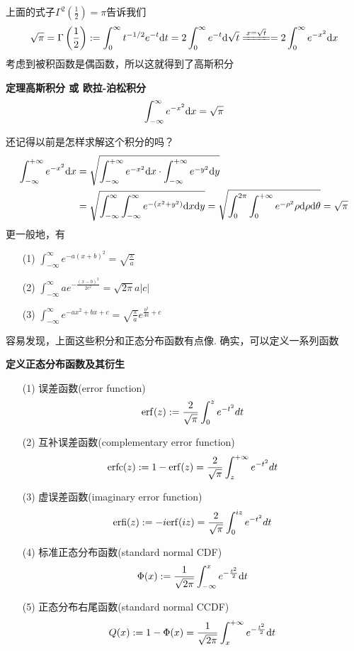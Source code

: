 \documentclass[UTF8]{ctexart}
\newcommand{\trm}[1]{{\rm #1}}
\newenvironment{definition}[1]
    {\begin{tcolorbox}[enhanced, colback=LightYellow, breakable=false, frame hidden, borderline west={1.5mm}{-2mm}{DarkGreen}]
    {\bfseries {\color{DarkGreen} 定义}\quad #1} \newline}
    {\end{tcolorbox}}
\newenvironment{theorem}[1]
    {\begin{tcolorbox}[enhanced, colback=LightYellow, breakable=true, frame hidden, borderline west={1.5mm}{-2mm}{DarkBlue}]
    {\bfseries {\color{DarkBlue} 定理}\quad #1} \newline}
    {\end{tcolorbox}}
\begin{document}
上面的式子\(\displaystyle{\Gamma^2\left(\frac{1}{2}\right) = \pi}\)告诉我们
\[\sqrt{\pi} = \Gamma\left(\frac{1}{2}\right) := \int_{0}^{\infty}t^{-1/2}e^{-t}\trm{d}t = 2\int_{0}^{\infty}e^{-t}\trm{d}\sqrt{t} \xlongequal[]{x=\sqrt{t}} = 2\int_{0}^{\infty}e^{-x^2}\trm{d}x\]
考虑到被积函数是偶函数，所以这就得到了高斯积分
\begin{theorem}{高斯积分 或 欧拉-泊松积分}
    \[\int_{-\infty}^{\infty}e^{-x^2}\trm{d}x = \sqrt{\pi}\]
\end{theorem}
还记得以前是怎样求解这个积分的吗？
\begin{align*}
    \int_{-\infty}^{+\infty} e^{-x^2} \trm{d} x &= \sqrt{\int_{-\infty}^{+\infty} e^{-x^2} \trm{d}x \cdot \int_{-\infty}^{+\infty} e^{-y^2} \trm{d}y} \\
    &= \sqrt{\int_{-\infty}^{\infty}\int_{-\infty}^{\infty} e^{-(x^2+y^2)} \trm{d}x \trm{d} y} = \sqrt{\int_{0}^{2 \pi}\int_{0}^{+\infty} e^{-\rho^2} \rho\trm{d} \rho \trm{d} \theta} = \sqrt{\pi}
\end{align*}
更一般地，有
\begin{itemize}
    \item [(1)] \(\displaystyle{\int_{-\infty}^{\infty}e^{-a(x+b)^2} = \sqrt{\frac{\pi}{a}}}\)
    \item [(2)] \(\displaystyle{\int_{-\infty}^{\infty}ae^{-\frac{(x-b)^2}{2c^2}} = \sqrt{2\pi}a|c|}\)
    \item [(3)] \(\displaystyle{\int_{-\infty}^{\infty}e^{-ax^2+bx+c} = \sqrt{\frac{\pi}{a}}}e^{\frac{b^2}{4a}+c}\)
\end{itemize}

容易发现，上面这些积分和正态分布函数有点像. 确实，可以定义一系列函数
\begin{definition}{正态分布函数及其衍生}
    \begin{itemize}
        \item [(1)] 误差函数(error function)
        \[ \trm{erf}(z):=\frac{2}{\sqrt{\pi}}\int_{0}^{z}e^{-t^{2}}dt \]
        \item [(2)] 互补误差函数(complementary error function)
        \[ \trm{erfc}(z) := 1-\trm{erf}(z) = \frac{2}{\sqrt{\pi}}\int_{z}^{+\infty}e^{-t^{2}}dt \]
        \item [(3)] 虚误差函数(imaginary error function)
        \[ \trm{erfi}(z) := -i\trm{erf}(iz) = \frac{2}{\sqrt{\pi}}\int_{0}^{iz}e^{-t^{2}}dt \]
        \item [(4)] 标准正态分布函数(standard normal CDF)
        \[ \Phi(x) := \frac{1}{\sqrt{2\pi}} \int_{-\infty}^{x} e^{-\frac{t^2}{2}} \trm{d}t \]
        \item [(5)] 正态分布右尾函数(standard normal CCDF)
        \[ Q(x) := 1-\Phi(x) = \frac{1}{\sqrt{2\pi}} \int_{x}^{+\infty} e^{-\frac{t^2}{2}} \trm{d}t \]
    \end{itemize}
\end{definition}
\end{document}
